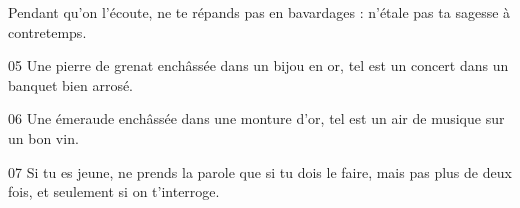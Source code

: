 
Pendant qu’on l’écoute, ne te répands pas en bavardages : n’étale pas ta sagesse à contretemps.

05 Une pierre de grenat enchâssée dans un bijou en or, tel est un concert dans un banquet bien arrosé.

06 Une émeraude enchâssée dans une monture d’or, tel est un air de musique sur un bon vin.

07 Si tu es jeune, ne prends la parole que si tu dois le faire, mais pas plus de deux fois, et seulement si on t’interroge.
